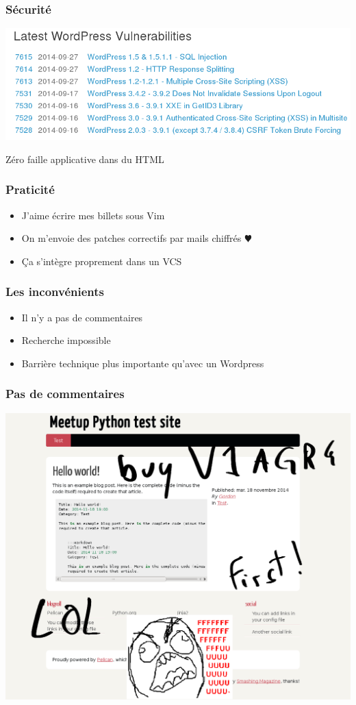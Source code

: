 \documentclass[frenchb,francais]{beamer}
\begin{document}
\begin{frame}
    \frametitle{Sécurité}
    \begin{center}\includegraphics[scale=.30]{img/wordpress-security.png}\end{center}
    Zéro faille applicative dans du HTML
\end{frame}

\begin{frame}
    \frametitle{Praticité}
    \begin{itemize}
        \item J’aime écrire mes billets sous Vim
        \item On m’envoie des patches correctifs par mails chiffrés $\varheart$
        \item Ça s’intègre proprement dans un VCS
    \end{itemize}
\end{frame}

\begin{frame}
    \frametitle{Les inconvénients}
    \begin{itemize}
        \item Il n’y a pas de commentaires
        \item Recherche impossible
        \item Barrière technique plus importante qu’avec un Wordpress
    \end{itemize}
\end{frame}

\begin{frame}
    \frametitle{Pas de commentaires}
    \begin{center}\includegraphics[scale=.17]{img/comments_2.png}\end{center}
\end{frame}
\end{document}
